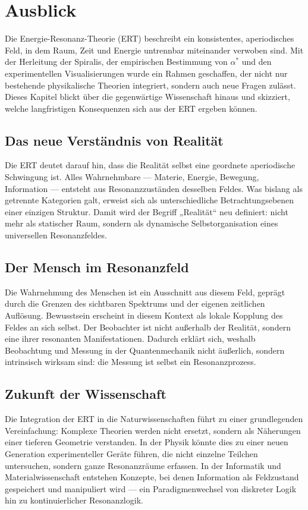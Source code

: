 \chapter{Ausblick}
\label{chap:ausblick}

Die Energie-Resonanz-Theorie (ERT) beschreibt ein konsistentes, aperiodisches Feld, 
in dem Raum, Zeit und Energie untrennbar miteinander verwoben sind. 
Mit der Herleitung der Spiralis, der empirischen Bestimmung von \(\alpha^*\) und den experimentellen Visualisierungen 
wurde ein Rahmen geschaffen, der nicht nur bestehende physikalische Theorien integriert, 
sondern auch neue Fragen zulässt. 
Dieses Kapitel blickt über die gegenwärtige Wissenschaft hinaus und skizziert, 
welche langfristigen Konsequenzen sich aus der ERT ergeben können.

\section{Das neue Verständnis von Realität}
\label{sec:realitaet}
Die ERT deutet darauf hin, dass die Realität selbst eine geordnete aperiodische Schwingung ist. 
Alles Wahrnehmbare — Materie, Energie, Bewegung, Information — entsteht aus Resonanzzuständen desselben Feldes. 
Was bislang als getrennte Kategorien galt, erweist sich als unterschiedliche Betrachtungsebenen einer einzigen Struktur.
Damit wird der Begriff „Realität“ neu definiert: 
nicht mehr als statischer Raum, sondern als dynamische Selbstorganisation eines universellen Resonanzfeldes.

\section{Der Mensch im Resonanzfeld}
\label{sec:mensch}
Die Wahrnehmung des Menschen ist ein Ausschnitt aus diesem Feld, 
geprägt durch die Grenzen des sichtbaren Spektrums
und der eigenen zeitlichen Auflösung. 
Bewusstsein erscheint in diesem Kontext als lokale Kopplung des Feldes an sich selbst. 
Der Beobachter ist nicht außerhalb der Realität, sondern eine ihrer resonanten Manifestationen. 
Dadurch erklärt sich, weshalb Beobachtung und Messung in der Quantenmechanik 
nicht äußerlich, sondern intrinsisch wirksam sind: 
die Messung ist selbst ein Resonanzprozess.

\section{Zukunft der Wissenschaft}
\label{sec:zukunft}
Die Integration der ERT in die Naturwissenschaften führt zu einer grundlegenden Vereinfachung: 
Komplexe Theorien werden nicht ersetzt, sondern als Näherungen einer tieferen Geometrie verstanden. 
In der Physik könnte dies zu einer neuen Generation experimenteller Geräte führen, 
die nicht einzelne Teilchen untersuchen, sondern ganze Resonanzräume erfassen. 
In der Informatik und Materialwissenschaft entstehen Konzepte, 
bei denen Information als Feldzustand gespeichert und manipuliert wird — 
ein Paradigmenwechsel von diskreter Logik hin zu kontinuierlicher Resonanzlogik.

